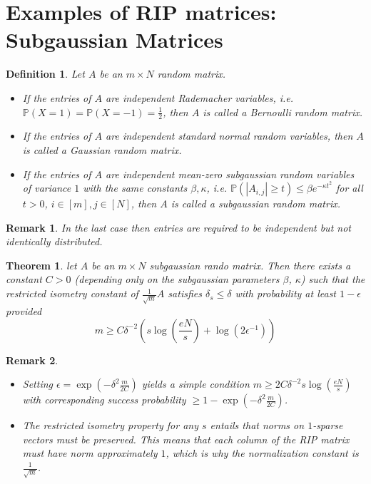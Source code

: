 \documentclass[10pt,a4paper]{article}
\theoremstyle{thmstyle}
\newtheorem{definition}{Definition}
\newtheorem{theorem}{Theorem}
\newtheorem{remark}{Remark}
\renewcommand{\Pr}[1]{\mathbb{P}\left( #1 \right)}
\begin{document}
\section{Examples of RIP matrices: Subgaussian Matrices}

\begin{definition}
  Let $A$ be an $m \times N$ random matrix.
  \begin{itemize}
  \item If the entries of $A$ are independent Rademacher variables, i.e. $\Pr{X = 1} = \Pr{X = -1} = \frac{1}{2}$, then $A$ is called a \emph{Bernoulli random matrix}.
  \item If the entries of $A$ are independent standard normal random variables, then $A$ is called a \emph{Gaussian random matrix}.
  \item If the entries of $A$ are independent mean-zero subgaussian random variables of variance $1$ with the same constants $\beta, \kappa$, i.e. $\Pr{|A_{i,j}| \ge t} \le \beta e^{-\kappa t^{2}}$ for all $t > 0$, $i \in [m], j \in [N]$, then $A$ is called a \emph{subgaussian random matrix}.
  \end{itemize}
\end{definition}

\begin{remark}
  In the last case then entries are required to be independent but not identically distributed.
\end{remark}

\begin{theorem}
  let $A$ be an $m \times N$ subgaussian rando matrix.
  Then there exists a constant $C > 0$ (depending only on the subgaussian parameters $\beta$, $\kappa$) such that the restricted isometry constant of $\frac{1}{\sqrt{m}}A$ satisfies $\delta_{s} \le \delta$ with probability at least $1 - \epsilon$ provided
  \begin{equation*}
    m \ge C \delta^{-2} \left( s \log\left( \frac{eN}{s} \right) + \log(2\epsilon^{-1}) \right)
  \end{equation*}
\end{theorem}

\begin{remark}
  \begin{itemize}
  \item Setting $\epsilon = \exp\left( -\delta^{2} \frac{m}{2C} \right)$ yields a simple condition $m \ge 2C\delta^{-2} s \log\left( \frac{eN}{s} \right)$ with corresponding success probability $\ge 1 - \exp\left( -\delta^{2} \frac{m}{2C} \right)$.
  \item The restricted isometry property for any $s$ entails that norms on $1$-sparse vectors must be preserved.
    This means that each column of the RIP matrix must have norm approximately $1$, which is why the normalization constant is $\frac{1}{\sqrt{m}}$.
  \end{itemize}
\end{remark}
\end{document}
